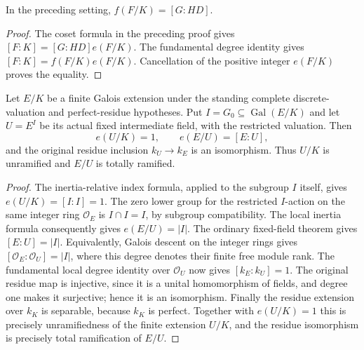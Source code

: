 \begin{corollary}
\label{fw:inertia-residue-index}
\leanok
In the preceding setting, $f(F/K)=[G:HD]$.
\end{corollary}
\begin{proof}
The coset formula in the preceding proof gives
$[F:K]=[G:HD]e(F/K)$. The fundamental degree identity gives
$[F:K]=f(F/K)e(F/K)$. Cancellation of the positive integer
$e(F/K)$ proves the equality.
\end{proof}

\begin{lemma}
\label{fw:inertia-fixed-field}
\leanok
Let $E/K$ be a finite Galois extension under the standing complete
discrete-valuation and perfect-residue hypotheses. Put
$I=G_0\subseteq\operatorname{Gal}(E/K)$ and let $U=E^I$ be its actual
fixed intermediate field, with the restricted valuation. Then
\[
 e(U/K)=1,\qquad e(E/U)=[E:U],
\]
and the original residue inclusion $k_U\longrightarrow k_E$ is an
isomorphism. Thus $U/K$ is unramified and $E/U$ is totally ramified.
\end{lemma}
\begin{proof}
The inertia-relative index formula, applied to the subgroup $I$ itself,
gives $e(U/K)=[I:I]=1$. The zero lower group for the restricted
$I$-action on the same integer ring $\mathcal O_E$ is $I\cap I=I$,
by subgroup compatibility. The local inertia formula consequently gives
$e(E/U)=|I|$. The ordinary fixed-field theorem gives $[E:U]=|I|$.
Equivalently, Galois descent on the integer rings gives
$[\mathcal O_E:\mathcal O_U]=|I|$, where this degree denotes their
finite free module rank. The fundamental local degree identity over
$\mathcal O_U$ now gives $[k_E:k_U]=1$. The original residue map is
injective, since it is a unital homomorphism of fields, and degree one
makes it surjective; hence it is an isomorphism. Finally the residue
extension over $k_K$ is separable, because $k_K$ is perfect. Together
with $e(U/K)=1$ this is precisely unramifiedness of the finite extension
$U/K$, and the residue isomorphism is precisely total ramification of
$E/U$.
\end{proof}

